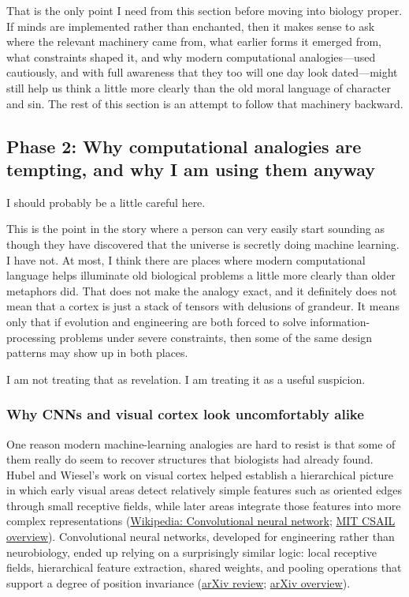 That is the only point I need from this section before moving into biology proper. If minds are implemented rather than enchanted, then it makes sense to ask where the relevant machinery came from, what earlier forms it emerged from, what constraints shaped it, and why modern computational analogies---used cautiously, and with full awareness that they too will one day look dated---might still help us think a little more clearly than the old moral language of character and sin. The rest of this section is an attempt to follow that machinery backward.

\subsection{Phase 2: Why computational analogies are tempting, and why I am using them anyway}\label{03_it_started-phase-2-why-computational-analogies-are-tempting-and-why-i-am-using-them-anyway}

I should probably be a little careful here.

This is the point in the story where a person can very easily start sounding as though they have discovered that the universe is secretly doing machine learning. I have not. At most, I think there are places where modern computational language helps illuminate old biological problems a little more clearly than older metaphors did. That does not make the analogy exact, and it definitely does not mean that a cortex is just a stack of tensors with delusions of grandeur. It means only that if evolution and engineering are both forced to solve information-processing problems under severe constraints, then some of the same design patterns may show up in both places.

I am not treating that as revelation. I am treating it as a useful suspicion.

\subsubsection{Why CNNs and visual cortex look uncomfortably alike}\label{03_it_started-why-cnns-and-visual-cortex-look-uncomfortably-alike}

One reason modern machine-learning analogies are hard to resist is that some of them really do seem to recover structures that biologists had already found. Hubel and Wiesel's work on visual cortex helped establish a hierarchical picture in which early visual areas detect relatively simple features such as oriented edges through small receptive fields, while later areas integrate those features into more complex representations (\href{https://en.wikipedia.org/wiki/Convolutional_neural_network}{Wikipedia: Convolutional neural network}; \href{https://people.csail.mit.edu/pulkitag/data/cnn_mimics_brain.pdf}{MIT CSAIL overview}). Convolutional neural networks, developed for engineering rather than neurobiology, ended up relying on a surprisingly similar logic: local receptive fields, hierarchical feature extraction, shared weights, and pooling operations that support a degree of position invariance (\href{https://arxiv.org/pdf/1901.06032}{arXiv review}; \href{https://arxiv.org/html/2412.06740v1}{arXiv overview}).

